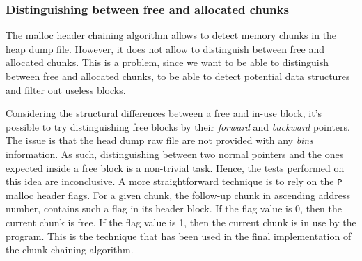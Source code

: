     \subsubsection{Distinguishing between free and allocated chunks}
    The malloc header chaining algorithm allows to detect memory chunks in the heap dump file. However, it does not allow to distinguish between free and allocated chunks. This is a problem, since we want to be able to distinguish between free and allocated chunks, to be able to detect potential data structures and filter out useless blocks.
    
    Considering the structural differences between a free and in-use block, it's possible to try distinguishing free blocks by their \textit{forward} and \textit{backward} pointers. The issue is that the head dump raw file are not provided with any \textit{bins} information. As such, distinguishing between two normal pointers and the ones expected inside a free block is a non-trivial task. Hence, the tests performed on this idea are inconclusive. A more straightforward technique is to rely on the \texttt{P} malloc header flags. For a given chunk, the follow-up chunk in ascending address number, contains such a flag in its header block. If the flag value is 0, then the current chunk is free. If the flag value is 1, then the current chunk is in use by the program. This is the technique that has been used in the final implementation of the chunk chaining algorithm. 

